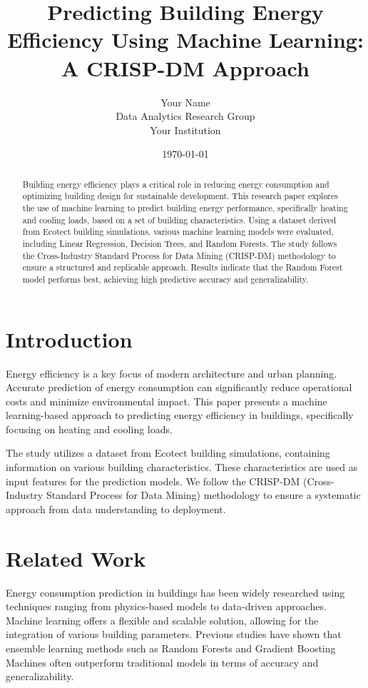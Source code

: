 \documentclass[12pt]{article}
\title{Predicting Building Energy Efficiency Using Machine Learning: A CRISP-DM Approach}
\author{Your Name \\
Data Analytics Research Group \\
Your Institution}
\date{\today}
\begin{document}
\maketitle

\begin{abstract}
Building energy efficiency plays a critical role in reducing energy consumption and optimizing building design for sustainable development. This research paper explores the use of machine learning to predict building energy performance, specifically heating and cooling loads, based on a set of building characteristics. Using a dataset derived from Ecotect building simulations, various machine learning models were evaluated, including Linear Regression, Decision Trees, and Random Forests. The study follows the Cross-Industry Standard Process for Data Mining (CRISP-DM) methodology to ensure a structured and replicable approach. Results indicate that the Random Forest model performs best, achieving high predictive accuracy and generalizability.
\end{abstract}

\section{Introduction}
Energy efficiency is a key focus of modern architecture and urban planning. Accurate prediction of energy consumption can significantly reduce operational costs and minimize environmental impact. This paper presents a machine learning-based approach to predicting energy efficiency in buildings, specifically focusing on heating and cooling loads.

The study utilizes a dataset from Ecotect building simulations, containing information on various building characteristics. These characteristics are used as input features for the prediction models. We follow the CRISP-DM (Cross-Industry Standard Process for Data Mining) methodology to ensure a systematic approach from data understanding to deployment.

\section{Related Work}
Energy consumption prediction in buildings has been widely researched using techniques ranging from physics-based models to data-driven approaches. Machine learning offers a flexible and scalable solution, allowing for the integration of various building parameters. Previous studies have shown that ensemble learning methods such as Random Forests and Gradient Boosting Machines often outperform traditional models in terms of accuracy and generalizability.
\end{document}
